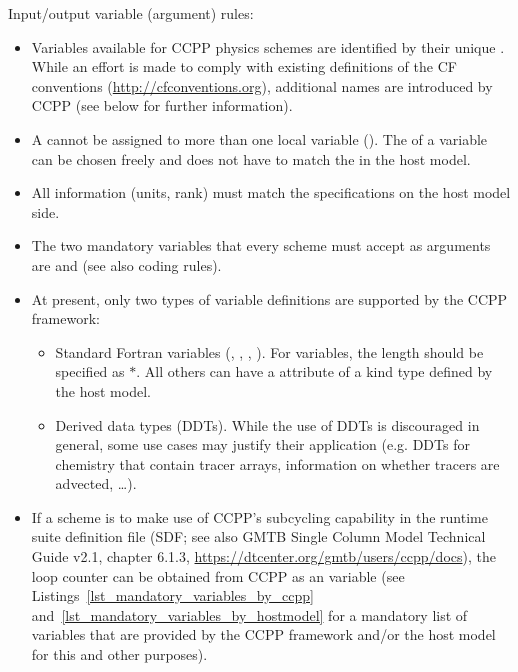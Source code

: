 Input/output variable (argument) rules:
\begin{itemize}
\item Variables available for CCPP physics schemes are identified by their unique . While an effort is made to comply with existing  definitions of the CF conventions (\url{http://cfconventions.org}), additional names are introduced by CCPP (see below for further information).
\item A  cannot be assigned to more than one local variable (). The  of a variable can be chosen freely and does not have to match the  in the host model.
\item All information (units, rank) must match the specifications on the host model side.
\item The two mandatory variables that every scheme must accept as  arguments are  and  (see also coding rules).
\item At present, only two types of variable definitions are supported by the CCPP framework:
\begin{itemize}
\item Standard Fortran variables (, , , ). For  variables, the length should be specified as $\ast$. All others can have a  attribute of a kind type defined by the host model.
\item Derived data types (DDTs). While the use of DDTs is discouraged in general, some use cases may justify their application (e.g. DDTs for chemistry that contain tracer arrays, information on whether tracers are advected, \dots).
\end{itemize}
\item If a scheme is to make use of CCPP's subcycling capability in the runtime suite definition file (SDF; see also GMTB Single Column Model Technical Guide v2.1, chapter 6.1.3, \url{https://dtcenter.org/gmtb/users/ccpp/docs}), the loop counter can be obtained from CCPP as an  variable (see Listings~\ref{lst_mandatory_variables_by_ccpp} and~\ref{lst_mandatory_variables_by_hostmodel} for a mandatory list of variables that are provided by the CCPP framework and/or the host model for this and other purposes).
\end{itemize}

